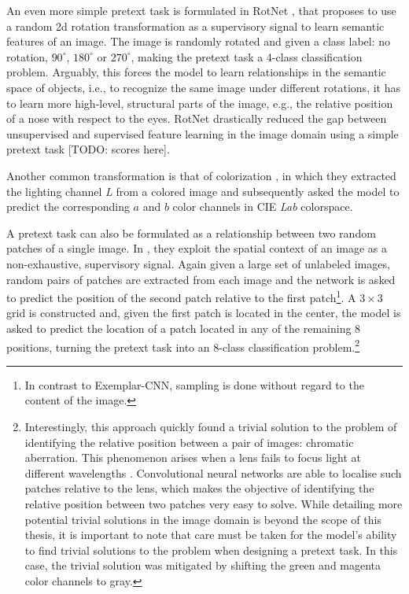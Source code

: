 An even more simple pretext task is formulated in RotNet \cite{gidaris2018unsupervised}, that proposes to use a random 2d rotation transformation as a supervisory signal to learn semantic features of an image.
The image is randomly rotated and given a class label: no rotation, $90^\circ$, $180^\circ$ or $270^\circ$, making the pretext task a 4-class classification problem.
Arguably, this forces the model to learn relationships in the semantic space of objects, i.e., to recognize the same image under different rotations, it has to learn more high-level, structural parts of the image, e.g., the relative position of a nose with respect to the eyes.
RotNet drastically reduced the gap between unsupervised and supervised feature learning in the image domain using a simple pretext task [TODO: scores here].

Another common transformation is that of colorization \cite{zhang_colorful_2016}, in which they extracted the lighting channel \textit{L} from a colored image and subsequently asked the model to predict the corresponding $a$ and $b$ color channels in CIE \textit{Lab} colorspace.

A pretext task can also be formulated as a relationship between two random patches of a single image. In \cite{doersch2015unsupervised}, they exploit the spatial context of an image as a non-exhaustive, supervisory signal.
Again given a large set of unlabeled images, random pairs of patches are extracted from each image and the network is asked to predict the position of the second patch relative to the first patch\footnote{In contrast to Exemplar-CNN, sampling is done without regard to the content of the image.}.
A $3\times 3$ grid is constructed and, given the first patch is located in the center, the model is asked to predict the location of a patch located in any of the remaining 8 positions, turning the pretext task into an 8-class classification problem.\footnote{
Interestingly, this approach quickly found a trivial solution to the problem of identifying the relative position between a pair of images: chromatic aberration.
This phenomenon arises when a lens fails to focus light at different wavelengths \cite{brewster_treatise_1835}.
Convolutional neural networks are able to localise such patches relative to the lens, which makes the objective of identifying the relative position between two patches very easy to solve.
While detailing more potential trivial solutions in the image domain is beyond the scope of this thesis, it is important to note that care must be taken for the model's ability to find trivial solutions to the problem when designing a pretext task.
In this case, the trivial solution was mitigated by shifting the green and magenta color channels to gray.
}

